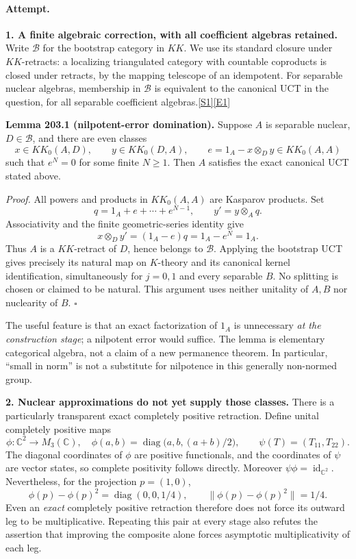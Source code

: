 \documentclass[11pt,a4paper]{article}
\newcommand{\C}{\mathbb{C}}
\newcommand{\sref}[2]{\hyperlink{source:#1:#2}{[S#2]}}
\newcommand{\eref}[2]{\hyperlink{extra:#1:#2}{[E#2]}}
\begin{document}
\paragraph{Attempt.}
\textbf{1. A finite algebraic correction, with all coefficient algebras retained.}
Write $\mathcal B$ for the bootstrap category in $KK$. We use its standard
closure under $KK$-retracts: a localizing triangulated category with
countable coproducts is closed under retracts, by the mapping telescope of
an idempotent. For separable nuclear algebras, membership in $\mathcal B$
is equivalent to the canonical UCT in the question, for all separable
coefficient algebras.\sref{203}{1}\eref{203}{1}

\textbf{Lemma 203.1 (nilpotent-error domination).}
Suppose $A$ is separable nuclear, $D\in\mathcal B$, and there are even
classes
\[
 x\in KK_0(A,D),\qquad y\in KK_0(D,A),\qquad
 e=1_A-x\otimes_Dy\in KK_0(A,A)
\]
such that $e^N=0$ for some finite $N\ge1$. Then $A$ satisfies the exact
canonical UCT stated above.

\emph{Proof.}
All powers and products in $KK_0(A,A)$ are Kasparov products. Set
\[
 q=1_A+e+\cdots+e^{N-1},\qquad y'=y\otimes_Aq.
\]
Associativity and the finite geometric-series identity give
\[
 x\otimes_Dy'=(1_A-e)q=1_A-e^N=1_A.
\]
Thus $A$ is a $KK$-retract of $D$, hence belongs to $\mathcal B$. Applying
the bootstrap UCT gives precisely its natural map on $K$-theory and its
canonical kernel identification, simultaneously for $j=0,1$ and every
separable $B$. No splitting is chosen or claimed to be natural.
This argument uses neither unitality of $A,B$ nor nuclearity of $B$.
\hfill$\square$

The useful feature is that an exact factorization of $1_A$ is unnecessary
\emph{at the construction stage}; a nilpotent error would suffice. The
lemma is elementary categorical algebra, not a claim of a new permanence
theorem. In particular, ``small in norm'' is not a substitute for
nilpotence in this generally non-normed group.

\textbf{2. Nuclear approximations do not yet supply those classes.}
There is a particularly transparent exact completely positive retraction.
Define unital completely positive maps
\[
 \phi:\C^2\longrightarrow M_3(\C),\quad
 \phi(a,b)=\operatorname{diag}\bigl(a,b,(a+b)/2\bigr),
 \qquad
 \psi(T)=(T_{11},T_{22}).
\]
The diagonal coordinates of $\phi$ are positive functionals, and the
coordinates of $\psi$ are vector states, so complete positivity follows
directly. Moreover $\psi\phi=\operatorname{id}_{\C^2}$. Nevertheless,
for the projection $p=(1,0)$,
\[
 \phi(p)-\phi(p)^2=\operatorname{diag}(0,0,1/4),\qquad
 \|\phi(p)-\phi(p)^2\|=1/4.
\]
Even an \emph{exact} completely positive retraction therefore does not force
its outward leg to be multiplicative. Repeating this pair at every stage
also refutes the assertion that improving the composite alone forces
asymptotic multiplicativity of each leg.
\end{document}

